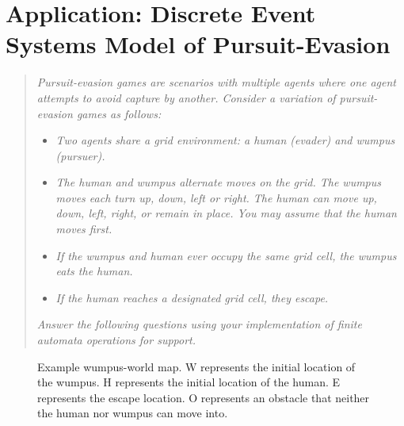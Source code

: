 \documentclass[12pt,letterpaper]{ntdhw}
\begin{document}
\clearpage

\section*{Application: Discrete Event Systems Model of Pursuit-Evasion}

\begin{quote}

\emph{\emph{Pursuit-evasion games} are scenarios with multiple agents
  where one agent attempts to avoid capture by another.  Consider a
  variation of pursuit-evasion games as follows:}

\begin{itemize}
  \item \it Two agents share a grid environment: a human (evader) and wumpus
  (pursuer).
  \item \it The human and wumpus alternate moves on the grid.  The
  wumpus moves each turn up, down, left or right.  The human can move
  up, down, left, right, or remain in place.  You may assume that the
  human moves first.
  \item \it If the wumpus and human ever occupy the same grid cell,
  the wumpus eats the human.
  \item \it If the human reaches a designated grid cell, they escape.
\end{itemize}

\emph{Answer the following questions using your implementation of finite
automata operations for support.}

\end{quote}

\begin{figure}[ht]
  \centering
  \caption{Example wumpus-world map.  W represents the initial
    location of the wumpus.  H represents the initial location of the
    human.  E represents the escape location.  O represents an
    obstacle that neither the human nor wumpus can move into.}
  \label{fig:map}
\end{figure}
\end{document}
